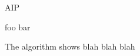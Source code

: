 \documentclass{article}
\begin{document}
\begin{algorithm}
  \caption{AIP}\label{AIPal}
  \begin{algorithmic}[1]
    \State foo
    \State bar
    \EndFunction
  \end{algorithmic}
\end{algorithm}

The  algorithm shows blah blah blah
\end{document}
